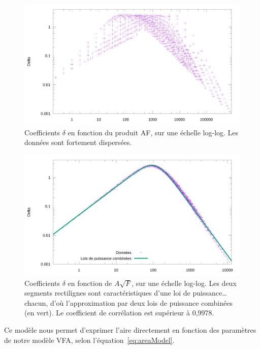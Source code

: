 	\begin{figure}[!htbp]
		\centering
		\includegraphics[width=\textwidth]{figures/ch4/af_delta}
		\caption[Coefficients $\delta$ en fonction du prdouit AF]{Coefficients $\delta$ en fonction du produit AF, sur une échelle log-log. Les données sont fortement dispersées.}
		\label{fig:af_delta}
	\end{figure}
	
	\begin{figure}[!htbp]
		\centering
		\includegraphics[width=\textwidth]{figures/ch4/a_rootF_delta}
		\caption[Coefficients $\delta$ en fonction de $A\sqrt{F}$]{Coefficients $\delta$ en fonction de $A\sqrt{F}$, sur une échelle log-log. Les deux segments rectilignes sont caractéristiques d'une loi de puissance\ldots{} chacun, d'où l'approximation par deux lois de puissance combinées (en vert). Le coefficient de corrélation est supérieur à 0,9978.}
		\label{fig:a_rootF_delta}
	\end{figure}
	
	Ce modèle nous permet d'exprimer l'aire directement en fonction des paramètres de notre modèle VFA, selon l'équation~\ref{eq:areaModel}.
	
